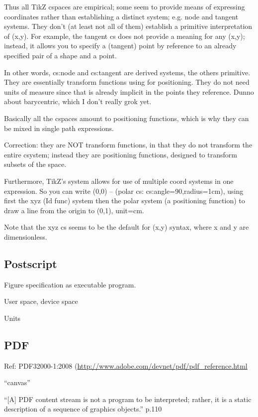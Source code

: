 \documentclass[reqno,12pt]{tufte-handout}
\numberwithin{equation}{subsection}
\numberwithin{equation}{subsection}
\begin{document}
\begin{appendices}
Thus all TikZ cspaces are empirical; some seem to provide means of
expressing coordinates rather than establishing a distinct system;
e.g. node and tangent systems.  They don't (at least not all of them)
establish a primitive interpretation of (x,y).  For example, the
tangent cs does not provide a meaning for any (x,y); instead, it
allows you to specify a (tangent) point by reference to an already
specified pair of a shape and a point.

In other words, cs:node and cs:tangent are derived systems, the others
primitive.  They are essentially transform functions using for
positioning.  They do not need units of measure since that is already
implicit in the points they reference.  Dunno about barycentric, which
I don't really grok yet.

Basically all the cspaces amount to positioning functions, which is
why they can be mixed in single path expressions.

Correction: they are NOT transform functions, in that they do not
transform the entire csystem; instead they are positioning functions,
designed to transform subsets of the space.

Furthermore, TikZ's system allows for use of multiple coord systems in
one expression.  So you can write (0,0) -- (polar cs:
cs:angle=90,radius=1cm), using first the xyz (Id func) system then the
polar system (a positioning function) to draw a line from the origin
to (0,1), unit=cm.

Note that the xyz cs seems to be the default for (x,y) syntax, where x
and y are dimensionless.

\subsection{Postscript}

Figure specification as executable program.

User space, device space

Units

\subsection{PDF}

Ref:  PDF32000-1:2008 (\url{http://www.adobe.com/devnet/pdf/pdf\_reference.html}

``canvas''

``[A] PDF content stream is not a program to be interpreted; rather, it is a static description of a sequence of graphics objects.'' p.110


\end{appendices}
\end{document}
